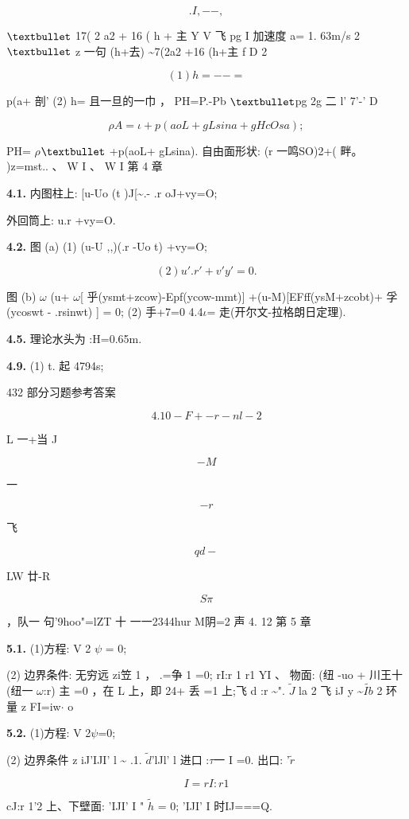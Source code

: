 \[.I,- - ,\]

${\rm •}$ 17( 2 a2 + 16 ( h + 主 Y V 飞 pg I 加速度 a= 1. 63m/s 2 ${\rm •}$ z 一句 (h+去) \textasciitilde{}7(2a2 +16 (h+主 f D 2

\[(1) h= --=\]

p(a+ 剖' (2) h= 且一旦的一巾 ， PH=P.-Pb ${\rm •}$pg 2g 二 l' 7'-' D

\[\rho A=\iota  + p(ao L + gLsina+ g H cOsa) ;\]

PH= $\rho$${\rm •}$ +p(aoL+ gLsina). 自由面形状: (r 一鸣SO)2+( 畔。 )z=mst.. 、 W I 、 W I 第 4 章

\noindent\textbf{4.1.} 内图柱上: [u-Uo (t )J[\textasciitilde{}.- .r oJ+vy=O;

外回筒上: u.r +vy=O.

\noindent\textbf{4.2.} 图 (a) (1) (u-U ,,)(.r -Uo t) +vy=O;

\[(2) u'.r' +v'y' =0.\]

图 (b) $\omega$ (u+ $\omega$[ 乎(ysmt+zcow)-Epf(ycow-mmt)] +(u-M)[EFff(ysM+zcobt)+ 孚(ycoswt - .rsinwt) ] = 0; (2) 手+7=0 4.4$\iota$= 走(开尔文-拉格朗日定理).

\noindent\textbf{4.5.} 理论水头为 :H=0.65m.

\noindent\textbf{4.9.} (1) t. 起 4794s;

432 部分习题参考答案

\[4. 10 -F+-r -nl-2\]

L 一+当 J

\[-M\]

一

\[-r\]

飞

\[qd-\]

LW 廿-R

\[S\pi \]

，队一 句'9hoo"=lZT 十 一一2344hur M阴=2 声 4. 12 第 5 章

\noindent\textbf{5.1.} (1)方程: V 2 $\psi$ = 0;

(2) 边界条件: 无穷远 zi笠 1 ， .=争 1 =0; rI:r 1 r1 YI 、 物面: (纽 -uo + 川王十(纽一 $\omega$:r) 主 =0 ，在 L 上，即 24+ 丢 =1 上;飞 d :r \textasciitilde{}". $\tilde{J}$ la 2 飞 iJ y \textasciitilde{}$\tilde{Ib}$ 2 环量 z FI=iw$\cdot $  o

\noindent\textbf{5.2.} (1)方程: V 2$\psi$=0;

(2) 边界条件 z iJ'IJI' l \textasciitilde{} .1. $\tilde{d}$'lJl' l 进口 :$\tau$一 I =0. 出口: '$\tilde{r}$

\[I = rI:r 1\]

cJ:r 1'2 上、下壁面: 'IJI' I " $\tilde{h}$ = 0; 'IJI' I 时IJ===Q.

